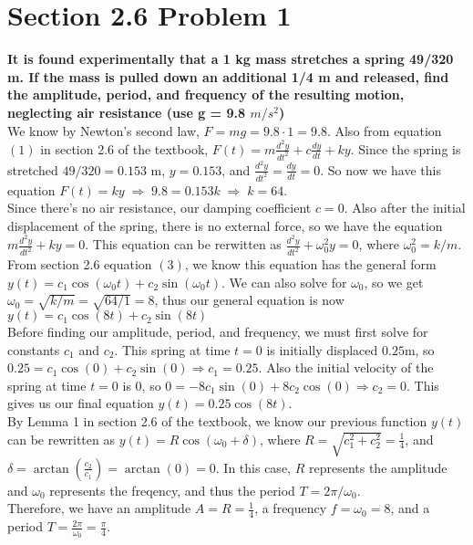 \documentclass[11pt]{article}
\begin{document}
 \section*{Section 2.6 Problem 1}
 \textbf{It is found experimentally that a 1 kg mass stretches a spring 49/320 m. 
 If the mass is pulled down an additional 1/4 m and released, find the amplitude, 
 period, and frequency of the resulting motion, neglecting air resistance (use 
 g = 9.8 $m/s^2$)} \\

 We know by Newton's second law, $F = mg = 9.8 \cdot 1 = 9.8$.  Also from equation $(1)$ in section 2.6 
 of the textbook, $F(t) = m\frac{d^2y}{dt^2} + c\frac{dy}{dt} + ky$.  Since the spring is stretched 
 $49/320 = 0.153$ m, $y = 0.153$, and $\frac{d^2y}{dt^2} = \frac{dy}{dt} = 0$.  So now we have this 
 equation $F(t) = ky \;\Rightarrow\; 9.8 = 0.153k \;\Rightarrow\; k = 64$. \\

 Since there's no air resistance, our damping coefficient $c = 0$.  Also after the initial displacement 
 of the spring, there is no external force, so we have the equation $m\frac{d^2y}{dt^2} + ky = 0$.
 This equation can be rerwitten as $\frac{d^2y}{dt^2} + \omega_0^2 y = 0$, where $\omega_0^2 = k/m$.
 From section 2.6 equation $(3)$, we know this equation has the general form 
 $y(t) = c_1\cos(\omega_0 t) + c_2\sin(\omega_0 t)$. We can also solve for $\omega_0$, so we get 
 $\omega_0 = \sqrt{k/m} = \sqrt{64/1} = 8$, thus our general equation is now 
 $y(t) = c_1\cos(8t) + c_2\sin(8t)$ \\ 

 Before finding our amplitude, period, and frequency, we must first solve for constants $c_1$ and $c_2$. 
 This spring at time $t=0$ is initially displaced $0.25$m, so $0.25 = c_1\cos(0) + c_2\sin(0) \Rightarrow 
 c_1 = 0.25$.  Also the initial velocity of the spring at time $t=0$ is $0$, so $0 = -8c_1\sin(0) + 
 8c_2\cos(0) \Rightarrow c_2 = 0$.  This gives us our final equation $y(t) = 0.25\cos(8t)$. \\ 

 By Lemma 1 in section 2.6 of the textbook, we know our previous function $y(t)$ can be rewritten as 
 $y(t) = R\cos(\omega_0 + \delta)$, where $R = \sqrt{c_1^2 + c_2^2} = \frac{1}{4}$, and 
 $\delta = \arctan(\frac{c_2}{c_1}) = \arctan(0) = 0$.  In this case, $R$ represents the amplitude and 
 $\omega_0$ represents the freqency, and thus the period $T = 2\pi / \omega_0$. \\

 Therefore, we have an amplitude $A = R = \frac{1}{4}$, a frequency $f = \omega_0 = 8$, and a period 
 $T = \frac{2\pi}{\omega_0} = \frac{\pi}{4}$.
\end{document}
